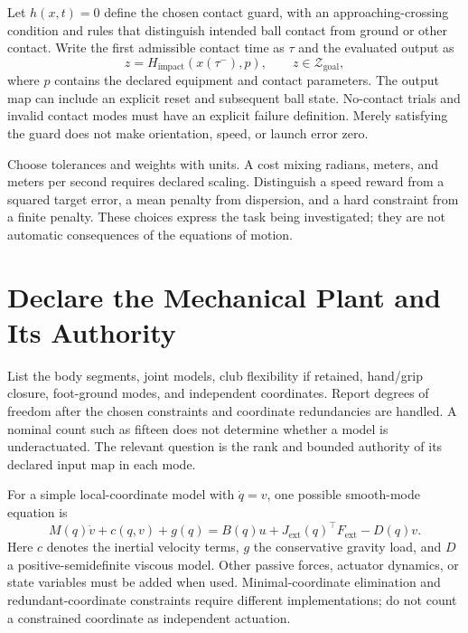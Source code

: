 \documentclass[12pt, openany]{book}
\theoremstyle{plain}
\begin{document}
Let $h(x,t)=0$ define the chosen contact guard, with an approaching-crossing condition and rules that distinguish intended ball contact from ground or other contact. Write the first admissible contact time as $\tau$ and the evaluated output as
\begin{equation}
z=H_{\mathrm{impact}}(x(\tau^-),p),\qquad z\in\mathcal Z_{\mathrm{goal}},
\end{equation}
where $p$ contains the declared equipment and contact parameters. The output map can include an explicit reset and subsequent ball state. No-contact trials and invalid contact modes must have an explicit failure definition. Merely satisfying the guard does not make orientation, speed, or launch error zero.

Choose tolerances and weights with units. A cost mixing radians, meters, and meters per second requires declared scaling. Distinguish a speed reward from a squared target error, a mean penalty from dispersion, and a hard constraint from a finite penalty. These choices express the task being investigated; they are not automatic consequences of the equations of motion.

\section{Declare the Mechanical Plant and Its Authority}

List the body segments, joint models, club flexibility if retained, hand/grip closure, foot-ground modes, and independent coordinates. Report degrees of freedom after the chosen constraints and coordinate redundancies are handled. A nominal count such as fifteen does not determine whether a model is underactuated. The relevant question is the rank and bounded authority of its declared input map in each mode.

For a simple local-coordinate model with $\dot q=v$, one possible smooth-mode equation is
\begin{equation}
M(q)\dot v+c(q,v)+g(q)
=B(q)u+J_{\mathrm{ext}}(q)^\top F_{\mathrm{ext}}-D(q)v .
\end{equation}
Here $c$ denotes the inertial velocity terms, $g$ the conservative gravity load, and $D$ a positive-semidefinite viscous model. Other passive forces, actuator dynamics, or state variables must be added when used. Minimal-coordinate elimination and redundant-coordinate constraints require different implementations; do not count a constrained coordinate as independent actuation.
\end{document}
